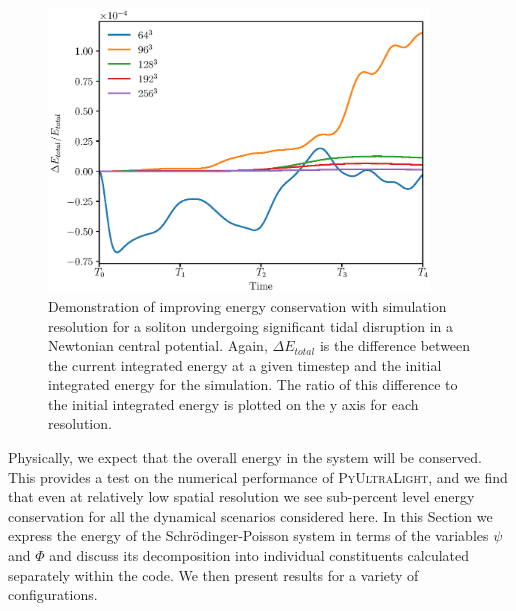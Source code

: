 \documentclass[a4paper,11pt]{article}
\newcommand{\PyUltraLight}{\textsc{PyUltraLight}\xspace}
\begin{document}
\begin{figure}
  \includegraphics[width=0.9\textwidth,trim=0 0.5cm 0 0,clip]{Total_Energy_Change_Disruption.eps}
  \caption{Demonstration of improving energy conservation with simulation resolution for a soliton undergoing significant tidal disruption in a Newtonian central potential. Again, $\Delta E_{total}$ is the difference between the current integrated energy at a given timestep and the initial integrated energy for the simulation. The ratio of this difference to the initial integrated energy is plotted on the y axis for each resolution.}
  \label{fig:energy_change_2}
\end{figure}


Physically, we expect that the overall energy in the system will be conserved. This provides a test on the numerical performance of \PyUltraLight, and we find that even at relatively low spatial resolution we see sub-percent level energy conservation for all the dynamical scenarios considered here. In this Section we express the energy of the Schr{\"o}dinger-Poisson system in terms of the variables  $\psi$ and $\Phi$ and discuss its decomposition into individual constituents calculated separately within the code. We then present results for a variety of configurations. 
\end{document}
